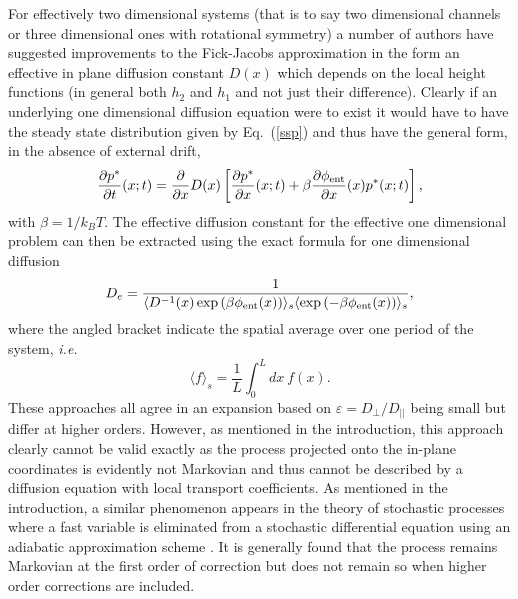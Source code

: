 \documentclass[pre,showpacs,preprintnumbers,amsmath,amssymb,superscriptaddress]{revtex4-1}
\begin{document}
For effectively two dimensional systems (that is to say two dimensional channels or three 
dimensional ones with rotational symmetry) a number of authors have suggested improvements to the Fick-Jacobs approximation in the form an effective in plane diffusion constant $D(x)$ which depends on the local height functions (in general both $h_2$ and $h_1$ and not just their difference). Clearly if an underlying one dimensional diffusion equation were to exist it would have to have the steady state distribution given by Eq.~(\ref{ssp}) and thus have the general form, in the absence of external drift,
\begin{equation}
\frac{\partial p^*}{\partial t}(x;t) = \frac{\partial}{\partial x} D(x) \left[ \frac{\partial p^*}{\partial x}(x;t)
+\beta \frac{\partial \phi_{\rm ent}}{\partial x}(x) p^*(x;t)\right], 
\end{equation}
with $\beta=1/k_BT$. The effective diffusion constant for the effective one dimensional problem can then be extracted using the exact formula for one dimensional diffusion \cite{lif1961}
\begin{equation}
D_e = \frac{1}{\langle D^{-1}(x)\exp\left(\beta\phi_{\rm ent}(x)\right)\rangle_s \langle \exp\left(-\beta\phi_{\rm ent}(x)\right)\rangle_s},\label{lif}
\end{equation}
where the angled bracket indicate the spatial average over one period of the system, {\em i.e.}
\begin{equation}
\langle f\rangle_s = \frac{1}{L}\int_0^L dx \ f(x).
\end{equation}
These approaches all agree in an expansion based on $\varepsilon= D_\perp/D_{||}$ being small but differ at higher orders. However, as mentioned in the introduction, this approach clearly cannot be valid exactly as the process projected onto the in-plane coordinates is evidently not Markovian and thus cannot be described by a diffusion equation with local transport coefficients. As mentioned in the introduction, a similar phenomenon appears in the theory of stochastic processes where a fast variable is eliminated from a stochastic differential equation using an adiabatic approximation scheme \cite{mig1980,ris1996,tou2009}. It is generally found that the process remains Markovian at the first order of correction but does not remain so when higher order corrections are included. 
\end{document}
